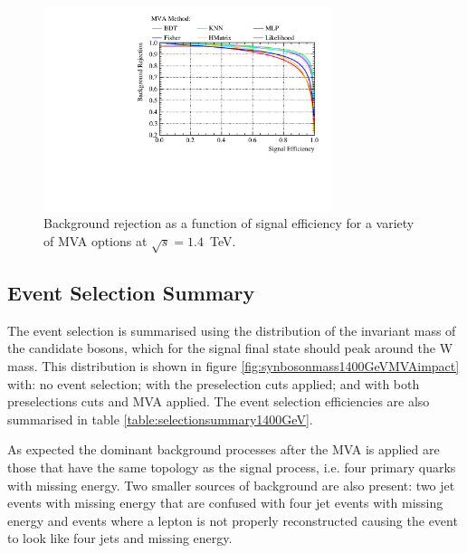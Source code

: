 \begin{figure}
\centering
\includegraphics[width=0.75\textwidth]{PhysicsAnalysis/Plots/MVAPlots/1400GeV/ThesisPlotMVAAlternatives1400GeV.pdf}
\caption[Background rejection as a function of signal efficiency for a variety of MVA options at $\sqrt{s}=1.4$~TeV.]{Background rejection as a function of signal efficiency for a variety of MVA options at $\sqrt{s}=1.4$~TeV.} 
\label{fig:mvaalternatives1400GeV}
\end{figure}


\subsection{Event Selection Summary}
\label{sec:eventselsummary1400GeV}
The event selection is summarised using the distribution of the invariant mass of the candidate bosons, which for the signal final state should peak around the W mass.  This distribution is shown in figure \ref{fig:synbosonmass1400GeVMVAimpact} with: no event selection; with the preselection cuts applied; and with both preselections cuts and MVA applied.  The event selection efficiencies are also summarised in table \ref{table:selectionsummary1400GeV}.

As expected the dominant background processes after the MVA is applied are those that have the same topology as the signal process, i.e. four primary quarks with missing energy.  Two smaller sources of background are also present: two jet events with missing energy that are confused with four jet events with missing energy and events where a lepton is not properly reconstructed causing the event to look like four jets and missing energy.  

